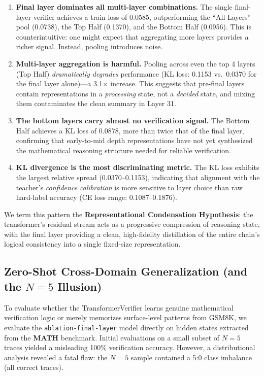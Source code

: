 \documentclass{article}
\begin{document}
\begin{enumerate}[leftmargin=1.5em, topsep=2pt, itemsep=2pt]
  \item \textbf{Final layer dominates all multi-layer combinations.} The single final-layer verifier achieves a train loss of 0.0585, outperforming the ``All Layers'' pool (0.0738), the Top Half (0.1370), and the Bottom Half (0.0956). This is counterintuitive: one might expect that aggregating more layers provides a richer signal. Instead, pooling introduces noise.
  
  \item \textbf{Multi-layer aggregation is harmful.} Pooling across even the top 4 layers (Top Half) \emph{dramatically degrades} performance (KL loss: 0.1153 vs.\ 0.0370 for the final layer alone)---a 3.1$\times$ increase. This suggests that pre-final layers contain representations in a \emph{processing} state, not a \emph{decided} state, and mixing them contaminates the clean summary in Layer 31.
  
  \item \textbf{The bottom layers carry almost no verification signal.} The Bottom Half achieves a KL loss of 0.0878, more than twice that of the final layer, confirming that early-to-mid depth representations have not yet synthesized the mathematical reasoning structure needed for reliable verification.
  
  \item \textbf{KL divergence is the most discriminating metric.} The KL loss exhibits the largest relative spread (0.0370--0.1153), indicating that alignment with the teacher's \emph{confidence calibration} is more sensitive to layer choice than raw hard-label accuracy (CE loss range: 0.1087--0.1876).
\end{enumerate}

We term this pattern the \textbf{Representational Condensation Hypothesis}: the transformer's residual stream acts as a progressive compression of reasoning state, with the final layer providing a clean, high-fidelity distillation of the entire chain's logical consistency into a single fixed-size representation.

\subsection{Zero-Shot Cross-Domain Generalization (and the \texorpdfstring{$N=5$}{N=5} Illusion)}
\label{sec:generalization}

To evaluate whether the TransformerVerifier learns genuine mathematical verification logic or merely memorizes surface-level patterns from GSM8K, we evaluate the \texttt{ablation-final-layer} model directly on hidden states extracted from the \textbf{MATH} benchmark. Initial evaluations on a small subset of $N=5$ traces yielded a misleading 100\% verification accuracy. However, a distributional analysis revealed a fatal flaw: the $N=5$ sample contained a 5:0 class imbalance (all correct traces). 
\end{document}
